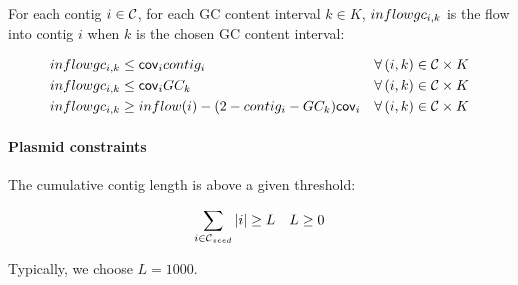 For each contig \(i \in \mathcal{C}{}\), for each GC content interval \(k \in K\), \(inflowgc_{i, k}\) is the flow into contig \(i\) when \(k\) is the chosen GC content interval:
\begin{Constraint}
  \begin{align}
    \inflowgc{i}{k} & \leq \cov{i} \contig{i} & \forall (i, k) \in \Contigs{} \times K \label{pbf_iterbin:milp:cst:gc:inflowgc_1}  \\ %
    \inflowgc{i}{k} & \leq \cov{i} GC_k & \forall (i, k) \in \Contigs{} \times K \label{pbf_iterbin:milp:cst:gc:inflowgc_2}  \\ %
    \inflowgc{i}{k} & \geq inflow(i)  - (2 - \contig{i} - GC_k) \cov{i} & \forall (i, k) \in \Contigs{} \times K \label{pbf_iterbin:milp:cst:gc:inflowgc_3} %
  \end{align}
\end{Constraint}

\paragraph{Plasmid constraints}

The cumulative contig length is above a given threshold:
%
\begin{Constraint}
  \begin{equation}
    \sum_{i \in \ContigSeeds{}} |i| \geq L \quad L \geq 0 \label{pbf_iterbin:milp:cst:misc:min_cumulative_contig_length} %
  \end{equation}
\end{Constraint}
%
Typically, we choose \(L = 1000\).